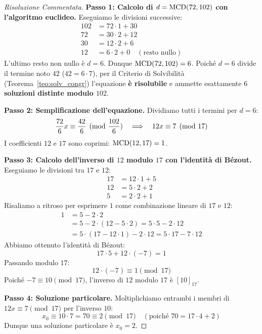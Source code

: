 \begin{proof}[Risoluzione Commentata]
\textbf{Passo 1: Calcolo di $d = \operatorname{MCD}(72, 102)$ con l'algoritmo euclideo.}
Eseguiamo le divisioni successive:
\begin{align*}
    102 &= 72 \cdot 1 + 30 \\
    72 &= 30 \cdot 2 + 12 \\
    30 &= 12 \cdot 2 + 6 \\
    12 &= 6 \cdot 2 + 0 \quad (\text{resto nullo})
\end{align*}
L'ultimo resto non nullo è $d = 6$. Dunque $\operatorname{MCD}(72, 102) = 6$.
Poiché $d = 6$ divide il termine noto $42$ ($42 = 6 \cdot 7$), per il Criterio di Solvibilità (Teorema~\ref{teo:solv_congr}) l'equazione \textbf{è risolubile} e ammette esattamente \textbf{$6$ soluzioni distinte modulo $102$}.

\textbf{Passo 2: Semplificazione dell'equazione.}
Dividiamo tutti i termini per $d = 6$:
\[
    \frac{72}{6} x \equiv \frac{42}{6} \pmod{\frac{102}{6}} \quad \Longrightarrow \quad 12x \equiv 7 \pmod{17}
\]
I coefficienti $12$ e $17$ sono coprimi: $\operatorname{MCD}(12, 17) = 1$.

\textbf{Passo 3: Calcolo dell'inverso di $12$ modulo $17$ con l'identità di Bézout.}
Eseguiamo le divisioni tra $17$ e $12$:
\begin{align*}
    17 &= 12 \cdot 1 + 5 \\
    12 &= 5 \cdot 2 + 2 \\
    5 &= 2 \cdot 2 + 1
\end{align*}
Risaliamo a ritroso per esprimere $1$ come combinazione lineare di $17$ e $12$:
\begin{align*}
    1 &= 5 - 2 \cdot 2 \\
    &= 5 - 2 \cdot (12 - 5 \cdot 2) = 5 \cdot 5 - 2 \cdot 12 \\
    &= 5 \cdot (17 - 12 \cdot 1) - 2 \cdot 12 = 5 \cdot 17 - 7 \cdot 12
\end{align*}
Abbiamo ottenuto l'identità di Bézout:
\[
    17 \cdot 5 + 12 \cdot (-7) = 1
\]
Passando modulo $17$:
\[
    12 \cdot (-7) \equiv 1 \pmod{17}
\]
Poiché $-7 \equiv 10 \pmod{17}$, l'inverso di $12$ modulo $17$ è $[10]_{17}$.

\textbf{Passo 4: Soluzione particolare.}
Moltiplichiamo entrambi i membri di $12x \equiv 7 \pmod{17}$ per l'inverso $10$:
\[
    x_0 \equiv 10 \cdot 7 = 70 \equiv 2 \pmod{17} \quad (\text{poiché } 70 = 17 \cdot 4 + 2)
\]
Dunque una soluzione particolare è $x_0 = 2$.


\end{proof}
